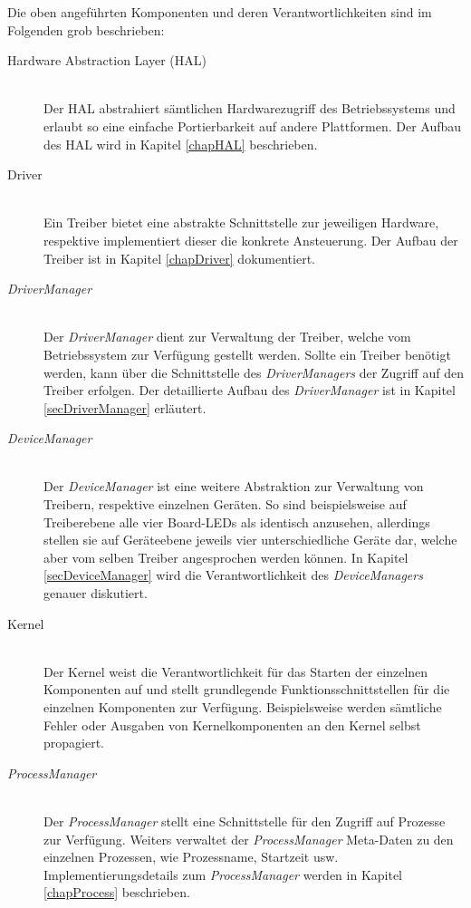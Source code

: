 Die oben angeführten Komponenten und deren Verantwortlichkeiten sind im Folgenden grob beschrieben: \\

\begin{description}
	\item[Hardware Abstraction Layer (HAL)] \hfill \\
	Der \ac{HAL} abstrahiert sämtlichen Hardwarezugriff des Betriebssystems und erlaubt so eine einfache Portierbarkeit auf andere Plattformen. Der Aufbau des \ac{HAL} wird in Kapitel \ref{chapHAL} beschrieben.
	
	\item[Driver] \hfill \\
	Ein Treiber bietet eine abstrakte Schnittstelle zur jeweiligen Hardware, respektive implementiert dieser die konkrete Ansteuerung. Der Aufbau der Treiber ist in Kapitel \ref{chapDriver} dokumentiert. 
	
	\item[\textit{DriverManager}] \hfill \\
	Der \textit{DriverManager} dient zur Verwaltung der Treiber, welche vom Betriebssystem zur Verfügung gestellt werden. Sollte ein Treiber benötigt werden, kann über die Schnittstelle des \textit{DriverManagers} der Zugriff auf den Treiber erfolgen. Der detaillierte Aufbau des \textit{DriverManager} ist in Kapitel \ref{secDriverManager} erläutert.
	
	\item[\textit{DeviceManager}] \hfill \\
	Der \textit{DeviceManager} ist eine weitere Abstraktion zur Verwaltung von Treibern, respektive einzelnen Geräten. So sind beispielsweise auf Treiberebene alle vier Board-LEDs als identisch anzusehen, allerdings stellen sie auf Geräteebene jeweils vier unterschiedliche Geräte dar, welche aber vom selben Treiber angesprochen werden können. In Kapitel \ref{secDeviceManager} wird die Verantwortlichkeit des \textit{DeviceManagers} genauer diskutiert.
	
	\item[Kernel] \hfill \\
	Der Kernel weist die Verantwortlichkeit für das Starten der einzelnen Komponenten auf und stellt grundlegende Funktionsschnittstellen für die einzelnen Komponenten zur Verfügung. Beispielsweise werden sämtliche Fehler oder Ausgaben von Kernelkomponenten an den Kernel selbst propagiert.
	
	\item[\textit{ProcessManager}] \hfill \\
	Der \textit{ProcessManager} stellt eine Schnittstelle für den Zugriff auf Prozesse zur Verfügung. Weiters verwaltet der \textit{ProcessManager} Meta-Daten zu den einzelnen Prozessen, wie Prozessname, Startzeit usw. Implementierungsdetails zum \textit{ProcessManager} werden in Kapitel \ref{chapProcess} beschrieben.
	

\end{description}
